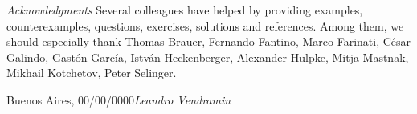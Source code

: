 \preface

%
%
%
% 
%




\textit{Acknowledgments} Several colleagues have helped by providing examples, counterexamples,
questions, exercises, solutions and references.  Among them, we should
especially thank Thomas Brauer, Fernando Fantino, Marco Farinati, C\'esar
Galindo, Gast\'on Garc\'ia, Istv\'an Heckenberger, Alexander Hulpke, Mitja Mastnak, Mikhail Kotchetov, Peter Selinger.

\vspace{\baselineskip}
\begin{flushright}\noindent
Buenos Aires, 00/00/0000\hfill {\it Leandro Vendramin}\\
\end{flushright}



